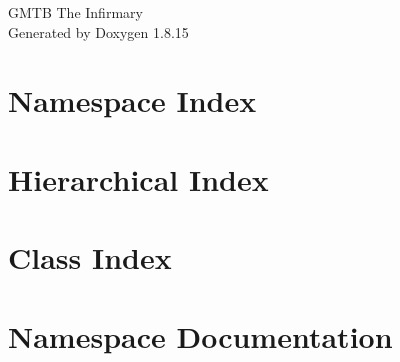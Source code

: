 \let\mypdfximage\pdfximage\def\pdfximage{\immediate\mypdfximage}\documentclass[twoside]{book}
\newcommand{\+}{\discretionary{\mbox{\scriptsize$\hookleftarrow$}}{}{}}
\newcommand{\clearemptydoublepage}{%
  \newpage{\pagestyle{empty}\cleardoublepage}%
}
\begin{document}
\hypersetup{pageanchor=false,
             bookmarksnumbered=true,
             pdfencoding=unicode
            }
\begin{titlepage}
\vspace*{7cm}
\begin{center}%
{\Large G\+M\+TB The Infirmary }\\
\vspace*{1cm}
{\large Generated by Doxygen 1.8.15}\\
\end{center}
\end{titlepage}
\clearemptydoublepage
{}
\tableofcontents
\clearemptydoublepage
{}
\hypersetup{pageanchor=true}

\chapter{Namespace Index}

\chapter{Hierarchical Index}

\chapter{Class Index}

\chapter{Namespace Documentation}


























\end{document}
